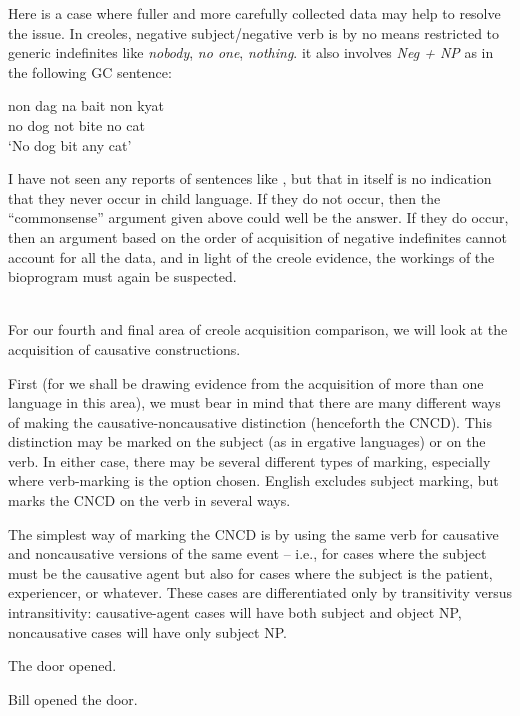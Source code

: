 Here is a case where fuller and more carefully collected data may help to resolve the issue. In creoles, negative subject/negative verb is by no means restricted to generic indefinites like \textit{nobody}, \textit{no one}, \textit{nothing}. it also involves \textit{Neg + NP} as in the following GC sentence:

\ea\label{ex:3:64}
\gll non dag na bait non kyat\\
no dog not bite no cat\\
\glt `No dog bit any cat'
\z


\noindent I have not seen any reports of sentences like , but that in itself is no indication that they never occur in child language. If they do not occur, then the ``commonsense'' argument given above could well be the answer. If they do occur, then an argument based on the order of acquisition of negative indefinites cannot account for all the data, and in light of the creole evidence, the workings of the bioprogram must again be suspected.\\\\

For our fourth and final area of creole acquisition comparison, we will look at the acquisition of causative constructions.

First (for we shall be drawing evidence from the acquisition of more than one language in this area), we must bear in mind that there are many different ways of making the causative-noncausative dis\-tinction (henceforth the CNCD). This distinction may be marked on the subject (as in ergative languages) or on the verb. In either case, there may be several different types of marking, especially where verb-marking is the option chosen. English excludes subject marking, but marks the CNCD on the verb in several ways.

The simplest way of marking the CNCD is by using the same verb for causative and noncausative versions of the same event -- i.e., for cases where the subject must be the causative agent but also for cases where the subject is the patient, experiencer, or whatever. These cases are differentiated only by transitivity versus intransitivity: causative-agent cases will have both subject and object NP, noncausative cases will have only subject NP.

\ea\label{ex:3:65}
 The door opened.
\z

\ea\label{ex:3:66}
 Bill opened the door.
\z

